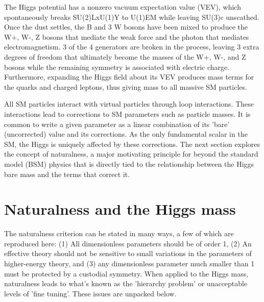 \documentclass[12pt]{article}
\begin{document}
    The Higgs potential has a nonzero vacuum expectation value (VEV), which spontaneously breaks SU(2)LxU(1)Y to U(1)EM while leaving SU(3)c unscathed. Once the dust settles, the B and 3 W bosons have been mixed to produce the W+, W-, Z bosons that mediate the weak force and the photon that mediates electromagnetism.  3 of the 4 generators are broken in the process, leaving 3 extra degrees of freedom that ultimately become the masses of the W+, W-, and Z bosons while the remaining symmetry is associated with electric charge. Furthermore, expanding the Higgs field about its VEV produces mass terms for the quarks and charged leptons, thus giving mass to all massive SM particles.  

    All SM particles interact with virtual particles through loop interactions. These interactions lead to corrections to SM parameters such as particle masses. It is common to write a given parameter as a linear combination of its 'bare' (uncorrected) value and its corrections. As the only fundamental scalar in the SM, the Higgs is uniquely affected by these corrections. The next section explores the concept of naturalness, a major motivating principle for beyond the standard model (BSM) physics that is directly tied to the relationship between the Higgs bare mass and the terms that correct it.

\section{Naturalness and the Higgs mass}
    The naturalness criterion can be stated in many ways, a few of which are reproduced here: (1) All dimensionless parameters should be of order 1, (2) An effective theory should not be sensitive to small variations in the parameters of higher-energy theory, and (3) any dimensionless parameter much smaller than 1 must be protected by a custodial symmetry. When applied to the Higgs mass, naturalness leads to what's known as the 'hierarchy problem' or unacceptable levels of 'fine tuning'. These issues are unpacked below.
\end{document}
